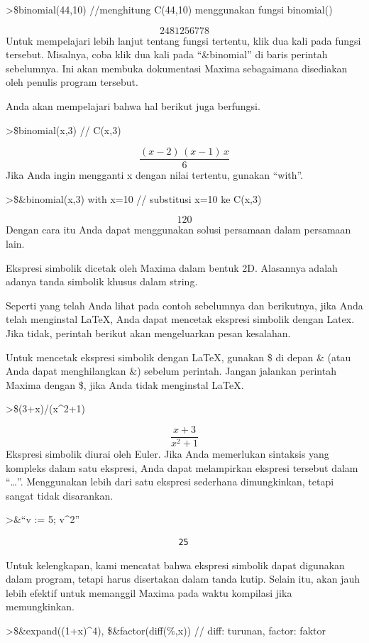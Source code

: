\documentclass[
]{book}
\begin{document}
\textgreater\$binomial(44,10) //menghitung C(44,10) menggunakan fungsi binomial()

\[2481256778\]Untuk mempelajari lebih lanjut tentang fungsi tertentu, klik dua kali pada fungsi tersebut. Misalnya, coba klik dua kali pada ``\&binomial'' di baris perintah sebelumnya. Ini akan membuka dokumentasi Maxima sebagaimana disediakan oleh penulis program tersebut.

Anda akan mempelajari bahwa hal berikut juga berfungsi.

\textgreater\$binomial(x,3) // C(x,3)

\[\frac{\left(x-2\right)\,\left(x-1\right)\,x}{6}\]Jika Anda ingin mengganti x dengan nilai tertentu, gunakan ``with''.

\textgreater\$\&binomial(x,3) with x=10 // substitusi x=10 ke C(x,3)

\[120\]Dengan cara itu Anda dapat menggunakan solusi persamaan dalam persamaan lain.

Ekspresi simbolik dicetak oleh Maxima dalam bentuk 2D. Alasannya adalah adanya tanda simbolik khusus dalam string.

Seperti yang telah Anda lihat pada contoh sebelumnya dan berikutnya, jika Anda telah menginstal LaTeX, Anda dapat mencetak ekspresi simbolik dengan Latex. Jika tidak, perintah berikut akan mengeluarkan pesan kesalahan.

Untuk mencetak ekspresi simbolik dengan LaTeX, gunakan \$ di depan \& (atau Anda dapat menghilangkan \&) sebelum perintah. Jangan jalankan perintah Maxima dengan \$, jika Anda tidak menginstal LaTeX.

\textgreater\$(3+x)/(x\^{}2+1)

\[\frac{x+3}{x^2+1}\]Ekspresi simbolik diurai oleh Euler. Jika Anda memerlukan sintaksis yang kompleks dalam satu ekspresi, Anda dapat melampirkan ekspresi tersebut dalam ``\ldots{}''. Menggunakan lebih dari satu ekspresi sederhana dimungkinkan, tetapi sangat tidak disarankan.

\textgreater\&``v := 5; v\^{}2''

\begin{verbatim}
                                  25
\end{verbatim}

Untuk kelengkapan, kami mencatat bahwa ekspresi simbolik dapat digunakan dalam program, tetapi harus disertakan dalam tanda kutip. Selain itu, akan jauh lebih efektif untuk memanggil Maxima pada waktu kompilasi jika memungkinkan.

\textgreater\$\&expand((1+x)\^{}4), \$\&factor(diff(\%,x)) // diff: turunan, factor: faktor
\end{document}
